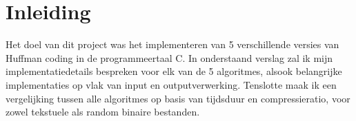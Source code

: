 \chapter*{Inleiding}

Het doel van dit project was het implementeren van 5 verschillende versies van Huffman coding in de programmeertaal C. In onderstaand verslag zal ik mijn implementatiedetails bespreken voor elk van de 5 algoritmes, alsook belangrijke implementaties op vlak van input en outputverwerking. Tenslotte maak ik een vergelijking tussen alle algoritmes op basis van tijdsduur en compressieratio, voor zowel tekstuele als random binaire bestanden.